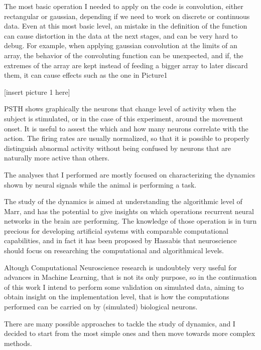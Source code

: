 The most basic operation I needed to apply on the code is convolution, either rectangular or gaussian, depending if we need to work on discrete or continuous data. Even at this most basic level, an mistake in the definition of the function can cause distortion in the data at the next stages, and can be very hard to debug. For example, when applying gaussian convolution at the limits of an array, the behavior of the convoluting function can be unexpected, and if, the extremes of the array are kept instead of feeding a bigger array to later discard them, it can cause effects such as the one in Picture1

[insert picture 1 here]

PSTH shows graphically the neurons that change level of activity when the subject is stimulated, or in the case of this experiment, around the movement onset. It is useful to assest the which and how many neurons correlate with the action. The firing rates are usually normalized, so that it is possible to properly distinguish abnormal activity without being confused by neurons that are naturally more active than others.


The analyses that I performed are mostly focused on characterizing the dynamics shown by neural signals while the animal is performing a task. 

The study of the dynamics is aimed at understanding the algorithmic level of Marr, and has the potential to give insights on which operations recurrent neural networks in the brain are performing. The knowledge of those operation is in turn precious for developing artificial systems with comparable computational capabilities, and in fact it has been proposed by Hassabis \cite{hassabis2017neuroscience} that neuroscience should focus on researching the computational and algorithmical levels. 

Altough Computational Neuroscience research is undoubtely very useful for advances in Machine Learning, that is not its only purpose, so in the continuation of this work I intend to perform some validation on simulated data, aiming to obtain insight on the implementation level, that is how the computations performed can be carried on by (simulated) biological neurons.

There are many possible approaches to tackle the study of dynamics, and I decided to start from the most simple ones and then move towards more complex methods.

